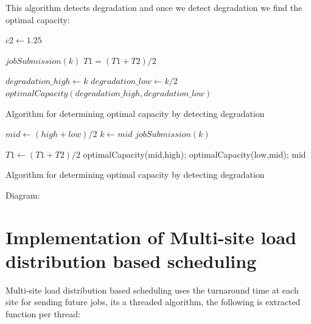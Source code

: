 \documentclass[ms,electronic,double]{nuthesis}
\begin{document}
This algorithm detects degradation and once we detect degradation we find the 
optimal capacity:

\begin{algorithm}
\begin{algorithmic}
\STATE $c2 \gets 1.25$ 

  \STATE $jobSubmission(k)$ 
  \STATE $T1=(T1+T2)/2$
\ENDIF

  \STATE $degradation\_high \gets k$
  \STATE $degradation\_low \gets k/2$
  \STATE $optimalCapacity(degradation\_high,degradation\_low)$
\ENDIF

\ENDWHILE

\end{algorithmic}
\caption{Algorithm for determining optimal capacity by detecting degradation}
\label{alg:Degradation Detection}
\end{algorithm}


\begin{algorithm}
\begin{algorithmic}

\STATE $mid \gets (high+low)/2$ 
\STATE $k \gets mid$
\STATE $jobSubmission(k)$ 

\STATE $T1 \gets (T1+T2)/2$
\STATE optimalCapacity(mid,high);
\ENDIF  
{}
\STATE optimalCapacity(low,mid);
\ENDIF
\RETURN mid
\end{algorithmic}
\caption{Algorithm for determining optimal capacity by detecting degradation}
\label{alg:optimalCapacity(high,low)}
\end{algorithm}


Diagram:

\section{Implementation of Multi-site load distribution based scheduling}
Multi-site load distribution based scheduling uses the turnaround time at each 
site for sending future jobs, its a threaded algorithm, the following is extracted function per thread:
\end{document}
